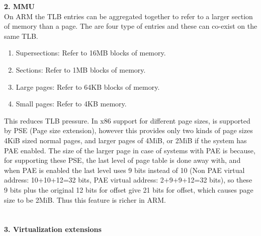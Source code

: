 \documentclass[seminar,twoside]{iitbreport}
\begin{document}
\textbf{2. MMU}\\

On ARM the TLB entries can be aggregated together to refer to a larger section of memory than a page. The are four type of entries and these can co-exist on the same TLB.
\begin{enumerate}
\item Supersections: Refer to 16MB blocks of memory.
\item Sections: Refer to 1MB blocks of memory.
\item Large pages: Refer to 64KB blocks of memory.
\item Small pages: Refer to 4KB memory.
\end{enumerate}

This reduces TLB pressure. 
In x86 support for different page sizes, is supported by PSE (Page size extension), however this provides only two kinds of page sizes 4KiB sized normal pages, and larger pages of 4MiB, or 2MiB if the system has PAE enabled. The size of the larger page in case of systems with PAE is because, for supporting these PSE, the last level of page table is done away with, and when PAE is enabled the last level uses 9 bits instead of 10 (Non PAE virtual address: 10+10+12=32 bits, PAE virtual address: 2+9+9+12=32 bits), so these 9 bits plus the original 12 bits for offset give 21 bits for offset, which causes page size to be 2MiB. Thus this feature is richer in ARM.
\\\\\\
\textbf{3. Virtualization extensions}
\\\\
\end{document}
